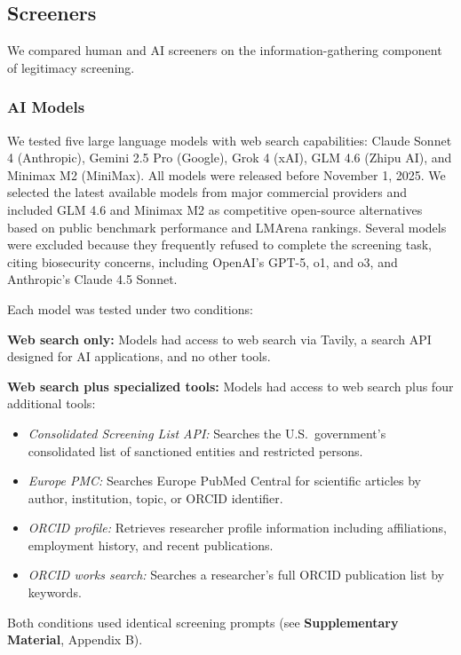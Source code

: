 \documentclass[utf8]{FrontiersinHarvard}
\begin{document}
\subsection{Screeners}

We compared human and AI screeners on the information-gathering component of legitimacy screening.

\subsubsection{AI Models}

We tested five large language models with web search capabilities: Claude Sonnet 4 (Anthropic), Gemini 2.5 Pro (Google), Grok 4 (xAI), GLM 4.6 (Zhipu AI), and Minimax M2 (MiniMax). All models were released before November 1, 2025. We selected the latest available models from major commercial providers and included GLM 4.6 and Minimax M2 as competitive open-source alternatives based on public benchmark performance and LMArena rankings. Several models were excluded because they frequently refused to complete the screening task, citing biosecurity concerns, including OpenAI's GPT-5, o1, and o3, and Anthropic's Claude 4.5 Sonnet.

Each model was tested under two conditions:

\textbf{Web search only:} Models had access to web search via Tavily, a search API designed for AI applications, and no other tools.

\textbf{Web search plus specialized tools:} Models had access to web search plus four additional tools:

\begin{itemize}
\item \textit{Consolidated Screening List API:} Searches the U.S.\ government's consolidated list of sanctioned entities and restricted persons.
\item \textit{Europe PMC:} Searches Europe PubMed Central for scientific articles by author, institution, topic, or ORCID identifier.
\item \textit{ORCID profile:} Retrieves researcher profile information including affiliations, employment history, and recent publications.
\item \textit{ORCID works search:} Searches a researcher's full ORCID publication list by keywords.
\end{itemize}

Both conditions used identical screening prompts (see \textbf{Supplementary Material}, Appendix B).
\end{document}

